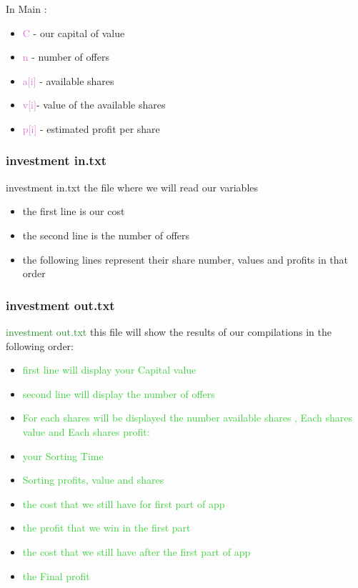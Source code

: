 \documentclass{article}
\begin{document}
In Main  :
\begin{itemize}
\item \textcolor{Orchid}{C} - our capital of value
\item \textcolor{Orchid}{n} - number of offers
\item \textcolor{Orchid}{a[i]} - available shares
\item \textcolor{Orchid}{v[i]}- value of the available shares
\item \textcolor{Orchid}{p[i]} -  estimated profit per share
\end{itemize}

\subsubsection{\textcolor{Periwinkle}{investment in.txt}}
\textcolor{BrickRed}{investment in.txt} the file where we will read our variables
\begin{itemize}
\item \textcolor{Bittersweet}{the first line is our cost} 
\item  \textcolor{Bittersweet}{the second line is the number of offers} 
\item  \textcolor{Bittersweet}{the following lines represent their share number, values and profits in that order} 

\end{itemize}
\subsubsection{\textcolor{Periwinkle}{investment out.txt}}
\textcolor{ForestGreen}{investment out.txt} this file will show the results of our compilations in the following order:
\begin{itemize}
\item  \textcolor{LimeGreen}{first line will display your Capital value}
\item \textcolor{LimeGreen}{second line will display the number of offers} 
\item \textcolor{LimeGreen}{For each shares will be displayed the number available shares , Each shares value and Each shares profit: }
\item \textcolor{LimeGreen}{your Sorting Time} 
\item \textcolor{LimeGreen}{Sorting profits, value and shares} 
\item \textcolor{LimeGreen}{the cost that we still have for first part of app}
\item \textcolor{LimeGreen}{the profit that we win in the first part }
\item \textcolor{LimeGreen}{the cost that we still have after the first part of app} 
\item \textcolor{LimeGreen}{the Final profit}
\end{itemize}
\end{document}
